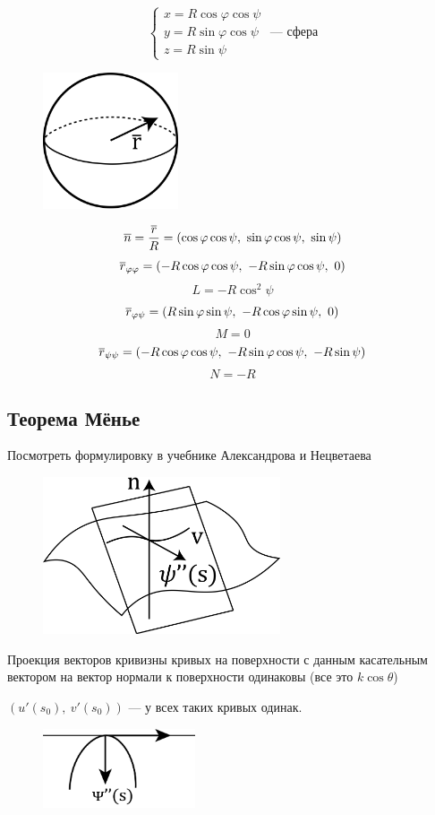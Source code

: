 \documentclass[main]{subfiles}
\begin{document}
	\begin{Example}
		\[\begin{cases}
			x = R \cos \varphi \cos \psi\\
			y = R \sin \varphi \cos \psi\\
			z = R \sin \psi
		\end{cases} \text{ --- сфера}\]
		\begin{figure}[H]
			\centering
			\includegraphics[width=4cm]{pics/7_6.png}
		\end{figure}
		\[\overline{n} = \dfrac{\overline{r}}{R} = (\cos \varphi \cos \psi,\ \sin \varphi \cos \psi,\ \sin \psi)\]
		\[\overline{r}_{\varphi \varphi} = (-R \cos \varphi \cos \psi,\ -R \sin \varphi \cos \psi,\ 0)\]
		\[L = -R \cos^2 \psi\]
		\[\overline{r}_{\varphi \psi} = (R \sin \varphi \sin \psi,\ -R \cos \varphi \sin \psi,\ 0)\]
		\[M = 0\]
		\[\overline{r}_{\psi \psi} = (-R \cos \varphi \cos \psi,\ -R \sin \varphi \cos \psi,\ -R \sin \psi)\]
		\[N = -R\]
	\end{Example}

	\subsection{Теорема Мёнье}
	\begin{advice}
        Посмотреть формулировку в учебнике Александрова и Нецветаева
    \end{advice}
	\begin{figure}[H]
		\centering
		\includegraphics[width=7cm]{pics/7_7.png}
	\end{figure}
	\begin{theorem}[Мёнье?]
		Проекция векторов кривизны кривых на поверхности с данным касательным вектором на вектор нормали к поверхности одинаковы (все это $k \cos \theta$)
	\end{theorem}
	$(u'(s_0),\ v'(s_0)) \text{ --- у всех таких кривых одинак.}$
	\begin{figure}[H]
		\centering
		\includegraphics[width=4.5cm]{pics/7_8.png}
	\end{figure}
\end{document}
